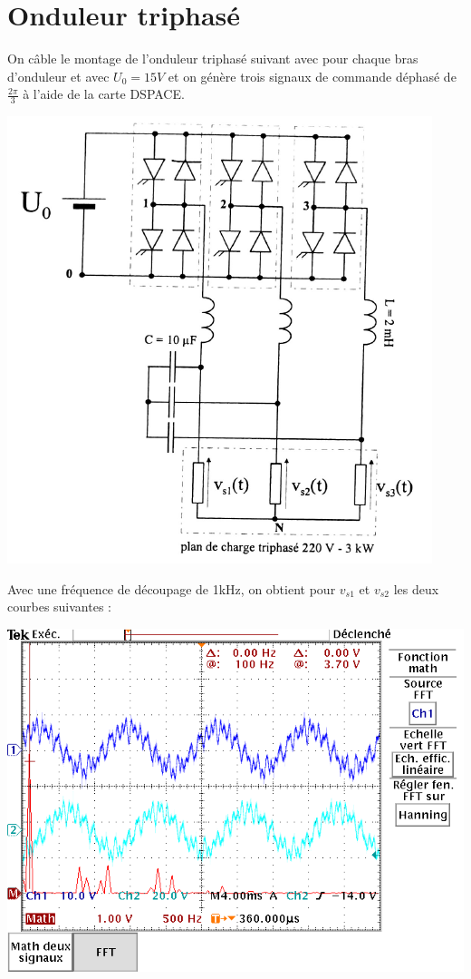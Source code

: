 \documentclass[10pt,a4paper]{article}
\begin{document}
	\section{Onduleur triphasé}
	On câble le montage de l'onduleur triphasé suivant avec pour chaque bras d'onduleur et avec $U_0 = 15V$ et on génère trois signaux de commande déphasé de $\frac{2\pi}{3}$ à l'aide de la carte DSPACE.
	\begin{center}
	\includegraphics[scale=0.5]{schema2.png}
	\end{center}

Avec une fréquence de découpage de 1kHz, on obtient pour $v_{s1}$ et $v_{s2}$ les deux courbes suivantes :	
	\begin{center}
	\includegraphics[scale=0.4]{triphase_vs12_1k.png}
	\end{center}
	
\end{document}
